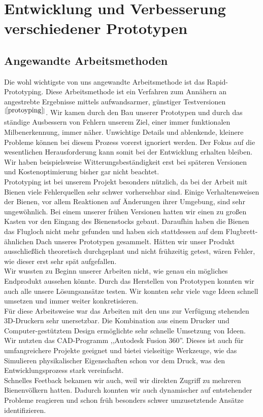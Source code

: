 \documentclass[11pt,a4paper]{article}
\newcommand{\bibRef}[1]{\hyperlink{#1}{$^{[\ref*{#1}{}]}$}}
\begin{document}
\newpage
\section{Entwicklung und Verbesserung verschiedener Prototypen} \label{section:Prototypen}
\subsection{Angewandte Arbeitsmethoden}
Die wohl wichtigste von uns angewandte Arbeitsmethode ist das Rapid-Prototyping. Diese Arbeitsmethode ist ein Verfahren zum Annähern an angestrebte Ergebnisse mittels aufwandsarmer, günstiger Testversionen \bibRef{protoyping}. Wir kamen durch den Bau unserer Prototypen und durch das ständige Ausbessern von Fehlern unserem Ziel, einer immer funktionalen Milbenerkennung, immer näher. Unwichtige Details und ablenkende, kleinere Probleme können bei diesem Prozess vorerst ignoriert werden. Der Fokus auf die wesentlichen Herausforderung kann somit bei der Entwicklung erhalten bleiben. Wir haben beispielsweise Witterungsbeständigkeit erst bei späteren Versionen und Kostenoptimierung bisher gar nicht beachtet.\\
Prototyping ist bei unserem Projekt besonders nützlich, da bei der Arbeit mit Bienen viele Fehlerquellen sehr schwer vorhersehbar sind. Einige Verhaltensweisen der Bienen, vor allem Reaktionen auf Änderungen ihrer Umgebung, sind sehr ungewöhnlich. Bei einem unserer frühen Versionen hatten wir einen zu großen Kasten vor den Eingang des Bienenstocks gebaut. Daraufhin haben die Bienen das Flugloch nicht mehr gefunden und haben sich stattdessen auf dem Flugbrett-ähnlichen Dach unseres Prototypen gesammelt. Hätten wir unser Produkt ausschließlich theoretisch durchgeplant und nicht frühzeitig getest, wären Fehler, wie dieser erst sehr spät aufgefallen.\\
Wir wussten zu Beginn unserer Arbeiten nicht, wie genau ein mögliches Endprodukt aussehen könnte. Durch das Herstellen von Prototypen konnten wir auch alle unsere Lösungsansätze testen. Wir konnten sehr viele vage Ideen schnell umsetzen und immer weiter konkretisieren.\\
Für diese Arbeitsweise war das Arbeiten mit den uns zur Verfügung stehenden 3D-Druckern sehr unersetzbar. Die Kombination aus einem Drucker und Computer-gestütztem Design ermöglichte sehr schnelle Umsetzung von Ideen. Wir nutzten das CAD-Programm ,,Autodesk Fusion 360''. Dieses ist auch für umfangreichere Projekte geeignet und bietei vielseitige Werkzeuge, wie das Simulieren physikalischer Eigenschaften schon vor dem Druck, was den Entwicklungsprozess stark vereinfacht. \\
Schnelles Feetback bekamen wir auch, weil wir direkten Zugriff zu mehreren Bienenvölkern hatten. Dadurch konnten wir auch dynamischer auf entstehender Probleme reagieren und schon früh besonders schwer umzusetztende Ansätze identifizieren.
\end{document}
